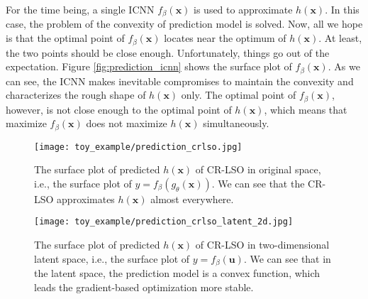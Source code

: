 \documentclass[10pt,twocolumn,letterpaper]{article}
\begin{document}
For the time being, a single ICNN $f_{\beta}(\boldsymbol{x})$ is used to approximate $h(\boldsymbol{x})$. In this case, the problem of the convexity of prediction model is solved. Now, all we hope is that the optimal point of $f_{\beta}(\boldsymbol{x})$ locates near the optimum of $h(\boldsymbol{x})$. At least, the two points should be close enough. Unfortunately, things go out of the expectation. Figure \ref{fig:prediction_icnn} shows the surface plot of $f_{\beta}(\boldsymbol{x})$. As we can see, the ICNN makes inevitable compromises to maintain the convexity and characterizes the rough shape of $h(\boldsymbol{x})$ only. The optimal point of $f_{\beta}(\boldsymbol{x})$, however, is not close enough to the optimal point of $h(\boldsymbol{x})$, which means that maximize $f_{\beta}(\boldsymbol{x})$ does not maximize $h(\boldsymbol{x})$ simultaneously. 
\begin{figure}[htbp]
	\centering
	\texttt{[image: toy\_example/prediction\_crlso.jpg]}
	\caption{The surface plot of predicted $h(\boldsymbol{x})$ of CR-LSO in original space, i.e., the surface plot of $y = f_{\beta}(g_{\theta}(\boldsymbol{x}))$. We can see that the CR-LSO approximates $h(\boldsymbol{x})$ almost everywhere.}
	\label{fig:prediction_crlso}
\end{figure}

\begin{figure}[htbp]
	\centering
	\texttt{[image: toy\_example/prediction\_crlso\_latent\_2d.jpg]}
	\caption{The surface plot of predicted $h(\boldsymbol{x})$ of CR-LSO in two-dimensional latent space, i.e., the surface plot of $y = f_{\beta}(\boldsymbol{u})$. We can see that in the latent space, the prediction model is a convex function, which leads the gradient-based optimization more stable.}
	\label{fig:prediction_crlso_latent}
\end{figure}
\end{document}
